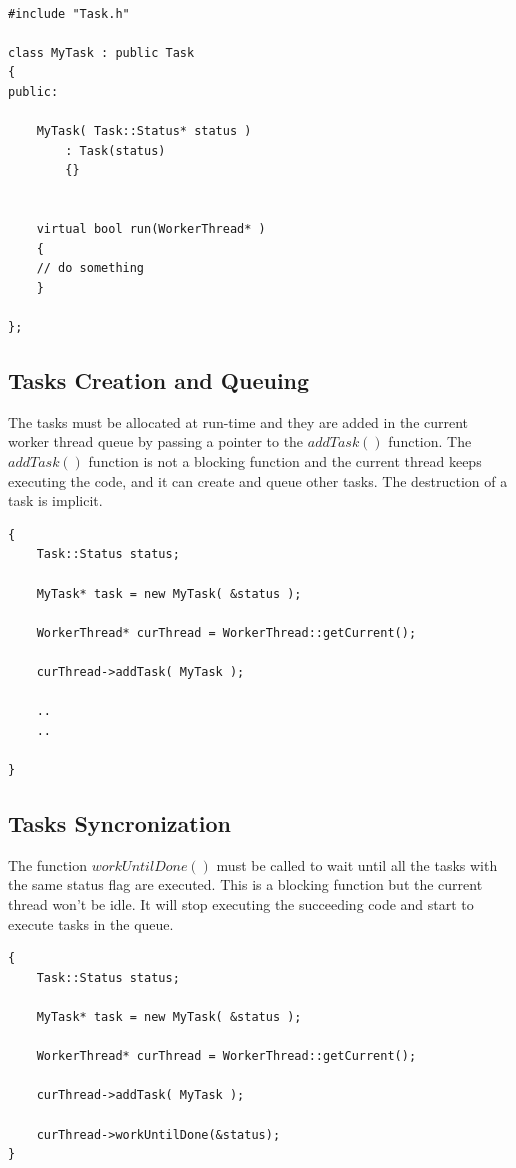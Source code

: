 \documentclass{article}
\begin{document}
\begin{lstlisting}

#include "Task.h"

class MyTask : public Task
{
public:

	MyTask( Task::Status* status )
		: Task(status) 
		{}
		

	virtual bool run(WorkerThread* )
	{
	// do something
	}

};

\end{lstlisting}



\subsection{Tasks Creation and Queuing}

The tasks must be allocated at run-time and they are added in the current worker thread queue by passing a pointer to the $addTask()$ function. 
The $addTask()$ function is not a blocking function and the current thread keeps executing the code, and it can create and queue other tasks.
The destruction of a task is implicit.


\begin{lstlisting}
{
	Task::Status status;

	MyTask* task = new MyTask( &status );

	WorkerThread* curThread = WorkerThread::getCurrent();

	curThread->addTask( MyTask );

	..
	..

}
\end{lstlisting}


\subsection{Tasks Syncronization}
The function $workUntilDone()$ must be called to wait until all the tasks with the same status flag are executed.
This is a blocking function but the current thread won't be idle.
It will stop executing the succeeding code and start to execute tasks in the queue.

\begin{lstlisting}
{
	Task::Status status;

	MyTask* task = new MyTask( &status );

	WorkerThread* curThread = WorkerThread::getCurrent();

	curThread->addTask( MyTask );

	curThread->workUntilDone(&status);
}
\end{lstlisting}
\end{document}
